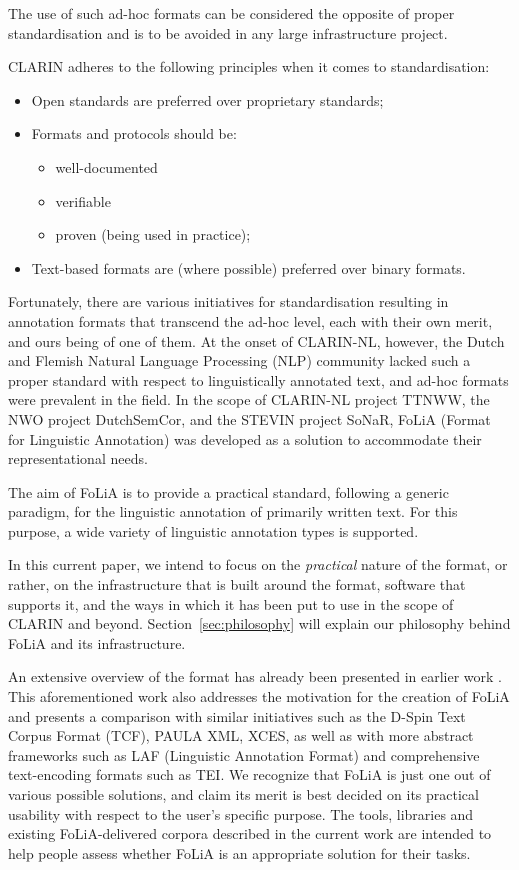 \documentclass[a4paper,11pt]{article}
\begin{document}
The use of such ad-hoc formats can be considered the opposite of proper
standardisation and is to be avoided in any large infrastructure project.

CLARIN adheres to the following principles when it comes to standardisation:

\begin{itemize}
    \item Open standards are preferred over proprietary standards;
    \item Formats and protocols should be:
    \begin{itemize}
        \item well-documented
        \item verifiable
        \item proven (being used in practice);
    \end{itemize}
    \item Text-based formats are (where possible) preferred over binary formats.
\end{itemize}

Fortunately, there are various initiatives for standardisation resulting in
annotation formats that transcend the ad-hoc level, each with their own merit, and ours
being of one of them. At the onset of CLARIN-NL, however, the Dutch and Flemish
Natural Language Processing (NLP) community lacked such a proper standard with
respect to linguistically annotated text, and ad-hoc formats were prevalent in
the field.  In the scope of CLARIN-NL project TTNWW, the NWO project
DutchSemCor, and the STEVIN project SoNaR, FoLiA (Format for Linguistic
Annotation) was developed as a solution to accommodate their representational
needs.

The aim of FoLiA is to provide a practical standard, following a generic
paradigm, for the linguistic annotation of primarily written text. For this purpose,
a wide variety of linguistic annotation types is supported. 

In this current paper, we intend to focus on the \emph{practical} nature of the
format, or rather, on the infrastructure that is built around the format,
software that supports it, and the ways in which it has been put to use in the
scope of CLARIN and beyond.  Section~\ref{sec:philosophy} will explain our
philosophy behind FoLiA and its infrastructure. 

An extensive overview of the format has already been presented in earlier work
\cite{FOLIACLIN2013}. This aforementioned work also addresses the motivation
for the creation of FoLiA and presents a comparison with similar initiatives
such as the D-Spin Text Corpus Format (TCF), PAULA XML, XCES, as well as with
more abstract frameworks such as LAF (Linguistic Annotation Format) and
comprehensive text-encoding formats such as TEI. We recognize that FoLiA is
just one out of various possible solutions, and claim its merit is best decided
on its practical usability with respect to the user's specific purpose. The
tools, libraries and existing FoLiA-delivered corpora described in the current work
are intended to help people assess whether FoLiA is an appropriate solution for
their tasks.
\end{document}
